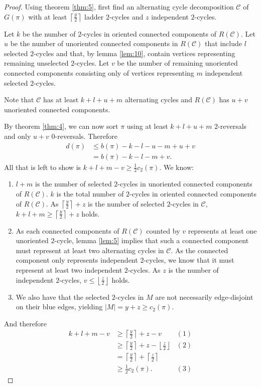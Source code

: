 \documentclass[11pt,DIV=11]{scrartcl}
\theoremstyle{definition}
\theoremstyle{remark}
\begin{document}
\begin{proof}
Using theorem \ref{thm:5}, first find an alternating cycle decomposition $\mathcal{C}$ of $G(\pi)$ with at least $\left\lceil \frac{y}{2} \right\rceil$ ladder $2$-cycles and $z$ independent $2$-cycles.

Let $k$ be the number of $2$-cycles in oriented connected components of $R(\mathcal{C})$. Let $u$ be the number of unoriented connected components in $R(\mathcal{C})$ that include $l$ selected $2$-cycles and that, by lemma \ref{lem:10}, contain vertices representing remaining unselected $2$-cycles. Let $v$ be the number of remaining unoriented connected components consisting only of vertices representing $m$ independent selected $2$-cycles.

Note that $\mathcal{C}$ has at least $k+l+u+m$ alternating cycles and $R(\mathcal{C})$ has $u+v$ unoriented connected components.

By theorem \ref{thm:4}, we can now sort $\pi$ using at least $k+l+u+m$ $2$-reversals and only $u+v$ $0$-reversals. Therefore
\begin{align*}
    d(\pi) &\leq b(\pi) - k - l - u - m + u + v \\
           &= b(\pi) - k - l - m + v.
\end{align*}
All that is left to show is $k+l+m-v \geq \frac{1}{2} c_2(\pi)$. We know:
\begin{enumerate}
    \item $l+m$ is the number of selected $2$-cycles in unoriented connected components of $R(\mathcal{C})$. $k$ is the total number of $2$-cycles in oriented connected components of $R(\mathcal{C})$. As $\left\lceil \frac{y}{2} \right\rceil + z$ is the number of selected $2$-cycles in $\mathcal{C}$, $k+l+m \geq \left\lceil \frac{y}{2} \right\rceil + z$ holds.
    \item As each connected components of $R(\mathcal{C})$ counted by $v$ represents at least one unoriented $2$-cycle, lemma \ref{lem:5} implies that such a connected component must represent at least two alternating cycles in $\mathcal{C}$. As the connected component only represents independent $2$-cycles, we know that it must represent at least two independent $2$-cycles. As $z$ is the number of independent $2$-cycles, $v \leq \left\lfloor \frac{z}{2} \right\rfloor$ holds.
    \item We also have that the selected $2$-cycles in $M$ are not necessarily edge-disjoint on their blue edges, yielding $|M| = y+z \geq c_2(\pi)$.
\end{enumerate}
And therefore
\begin{align*}
    k+l+m-v &\geq \left\lceil \frac{y}{2} \right\rceil + z - v                                          & (1) \\
            &\geq \left\lceil \frac{y}{2} \right\rceil + z - \left\lfloor \frac{z}{2} \right\rfloor     & (2) \\
            &= \left\lceil \frac{y}{2} \right\rceil + \left\lceil \frac{z}{2} \right\rceil \\
            &\geq \frac{1}{2} c_2(\pi).                                                                 & (3)
\end{align*}
\end{proof}
\end{document}

